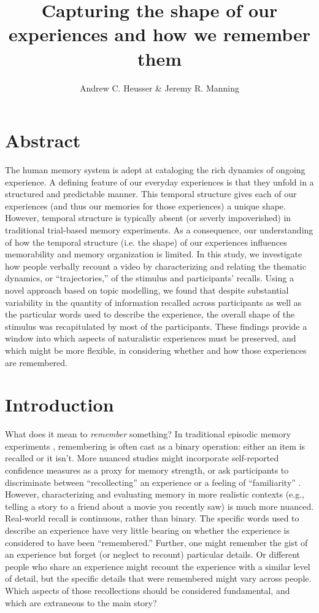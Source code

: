 \documentclass{article}
\title{Capturing the shape of our experiences and how we remember them}
\author{Andrew C. Heusser \& Jeremy R. Manning}
\begin{document}
\maketitle

\section{Abstract}
{
The human memory system is adept at cataloging the rich dynamics of ongoing experience. A defining feature of our everyday experiences is that they unfold in a structured and predictable manner. This temporal structure gives each of our experiences (and thus our memories for those experiences) a unique shape.  However, temporal structure is typically absent (or severly impoverished) in traditional trial-based memory experiments. As a consequence, our understanding of how the temporal structure (i.e. the shape) of our experiences influences memorability and memory organization is limited. In this study, we investigate how people verbally recount a video by characterizing and relating the thematic dynamics, or ``trajectories,'' of the stimulus and participants' recalls. Using a novel approach based on topic modelling, we found that despite substantial variability in the quantity of information recalled across participants as well as the particular words used to describe the experience, the overall shape of the stimulus was recapitulated by most of the participants. These findings provide a window into which aspects of naturalistic experiences must be preserved, and which might be more flexible, in considering whether and how those experiences are remembered.

\section{Introduction}

What does it mean to \textit{remember} something? In traditional episodic memory experiments \citep[e.g., list-learning or trial-based experiments;][]{Murd62a, Kaha96}, remembering is often cast as a binary operation: either an item is recalled or it isn't. More nuanced studies might incorporate self-reported confidence measures as a proxy for memory strength, or ask participants to discriminate between ``recollecting'' an experience or a feeling of ``familiarity'' \citep{Yone02}. However, characterizing and evaluating memory in more realistic contexts (e.g., telling a story to a friend about a movie you recently saw) is much more nuanced. Real-world recall is continuous, rather than binary.  The specific words used to describe an experience have very little bearing on whether the experience is considered to have been ``remembered.''  Further, one might remember the gist of an experience but forget (or neglect to recount) particular details.  Or different people who share an experience might recount the experience with a similar level of detail, but the specific details that were remembered might vary across people.  Which aspects of those recollections should be considered fundamental, and which are extraneous to the main story?

}
\end{document}
